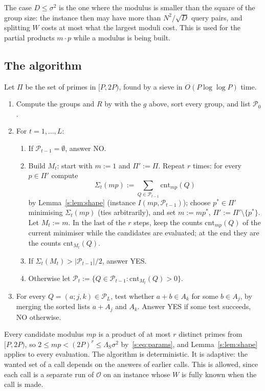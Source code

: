 \documentclass[11pt]{article}
\theoremstyle{definition}
\theoremstyle{remark}
\newcommand{\cnt}{\mathrm{cnt}}
\newcommand{\Pq}{\mathcal{P}}
\begin{document}
The case $D\le\sigma^2$ is the one where the modulus is smaller than the square of the group size: the instance then may have more than $N^2/\sqrt D$ query pairs, and splitting $W$ costs at most what the largest moduli cost. This is used for the partial products $m\cdot p$ while a modulus is being built.

\subsection{The algorithm}\label{s:sec:algorithm}

Let $\Pi$ be the set of primes in $[P,2P)$, found by a sieve in $O(P\log\log P)$ time.
\begin{enumerate}[label=\arabic*.]
\item Compute the groups and $R$ by \cite[Lemma~3.3]{FKP24} with the $g$ above, sort every group, and list $\Pq_0$.
\item For $t=1,\dots,L$:
\begin{enumerate}[label=(\alph*)]
\item If $\Pq_{t-1}=\emptyset$, answer NO.
\item Build $M_t$: start with $m:=1$ and $\Pi':=\Pi$. Repeat $r$ times: for every $p\in\Pi'$ compute
\[\Sigma_t(mp):=\sum_{Q\in\Pq_{t-1}}\cnt_{mp}(Q)\]
by Lemma~\ref{s:lem:shape} (instance $I(mp,\Pq_{t-1})$); choose $p^*\in\Pi'$ minimising $\Sigma_t(mp)$ (ties arbitrarily), and set $m:=mp^*$, $\Pi':=\Pi'\setminus\{p^*\}$. Let $M_t:=m$. In the last of the $r$ steps, keep the counts $\cnt_{mp}(Q)$ of the current minimiser while the candidates are evaluated; at the end they are the counts $\cnt_{M_t}(Q)$.
\item If $\Sigma_t(M_t)>|\Pq_{t-1}|/2$, answer YES.
\item Otherwise let $\Pq_t:=\{Q\in\Pq_{t-1}:\cnt_{M_t}(Q)>0\}$.
\end{enumerate}
\item For every $Q=(a;j,k)\in\Pq_L$, test whether $a+b\in A_k$ for some $b\in A_j$, by merging the sorted lists $a+A_j$ and $A_k$. Answer YES if some test succeeds, NO otherwise.
\end{enumerate}
Every candidate modulus $mp$ is a product of at most $r$ distinct primes from $[P,2P)$, so $2\le mp<(2P)^r\le\Lambda_{\mathrm S}\sigma^2$ by~\eqref{s:eq:params}, and Lemma~\ref{s:lem:shape} applies to every evaluation. The algorithm is deterministic. It is adaptive: the wanted set of a call depends on the answers of earlier calls. This is allowed, since each call is a separate run of $\mathcal O$ on an instance whose $W$ is fully known when the call is made.
\end{document}
